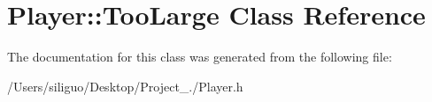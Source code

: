 \hypertarget{class_player_1_1_too_large}{}\section{Player\+:\+:Too\+Large Class Reference}
\label{class_player_1_1_too_large}


The documentation for this class was generated from the following file\+:\begin{DoxyCompactItemize}
\item 
/\+Users/siliguo/\+Desktop/\+Project\+\_./Player.\+h\end{DoxyCompactItemize}
